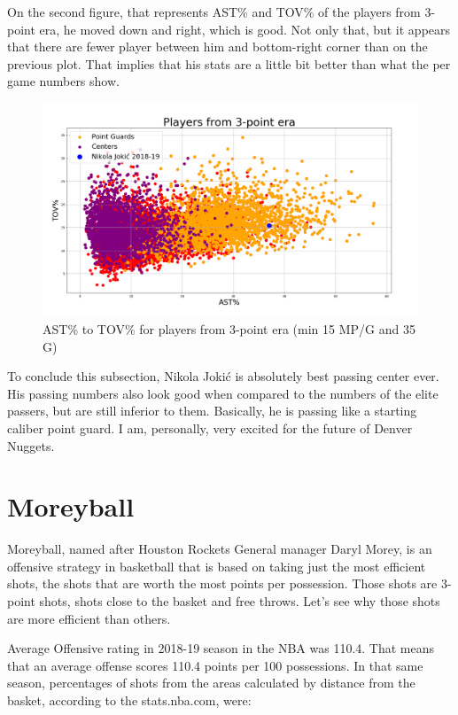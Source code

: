\documentclass[a4paper]{article}
\begin{document}
On the second figure, that represents AST\% and TOV\% of the players from 3-point era, he moved down and right, which is good. Not only that, but it appears that there are fewer player between him and bottom-right corner than on the previous plot. That implies that his stats are a little bit better than what the per game numbers show.

\begin{figure}[h!]
\begin{center}
\includegraphics[scale=0.30]{ast_tov_pct_3point_era.png}
\end{center}
\caption{AST\% to TOV\% for players from 3-point era (min 15 MP/G and 35 G)}
\label{plt:ast_tov_pct_3p}
\end{figure}

To conclude this subsection, Nikola Joki\' c is absolutely best passing center ever. His passing numbers also look good when compared to the numbers of the elite passers, but are still inferior to them. Basically, he is passing like a starting caliber point guard. I am, personally, very excited for the future of Denver Nuggets.

\pagebreak

\section{Moreyball}
\label{sec:moreyball}

Moreyball, named after Houston Rockets General manager Daryl Morey, is an offensive strategy in basketball that is based on taking just the most efficient shots, the shots that are worth the most points per possession. Those shots are 3-point shots, shots close to the basket and free throws. Let's see why those shots are more efficient than others.

Average Offensive rating in 2018-19 season in the NBA was 110.4. That means that an average offense scores 110.4 points per 100 possessions. In that same season, percentages of shots from the areas calculated by distance from the basket, according to the stats.nba.com, were:
\end{document}
